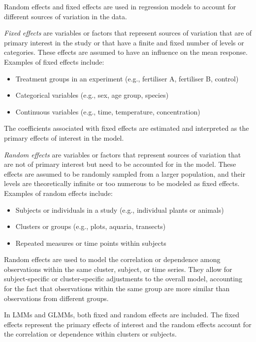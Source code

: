 \documentclass[
  letterpaper,
]{book}
\providecommand{\tightlist}{%
  \setlength{\itemsep}{0pt}\setlength{\parskip}{0pt}}\usepackage{longtable,booktabs,array}
\begin{document}
\begin{tcolorbox}[enhanced jigsaw, opacitybacktitle=0.6, toptitle=1mm, colframe=quarto-callout-note-color-frame, arc=.35mm, left=2mm, rightrule=.15mm, coltitle=black, opacityback=0, bottomrule=.15mm, bottomtitle=1mm, title=\textcolor{quarto-callout-note-color}{\faInfo}\hspace{0.5em}{Fixed and Random Effects}, toprule=.15mm, colbacktitle=quarto-callout-note-color!10!white, titlerule=0mm, leftrule=.75mm, colback=white, breakable]

Random effects and fixed effects are used in regression models to
account for different sources of variation in the data.

\emph{Fixed effects} are variables or factors that represent sources of
variation that are of primary interest in the study or that have a
finite and fixed number of levels or categories. These effects are
assumed to have an influence on the mean response. Examples of fixed
effects include:

\begin{itemize}
\tightlist
\item
  Treatment groups in an experiment (e.g., fertiliser A, fertiliser B,
  control)
\item
  Categorical variables (e.g., sex, age group, species)
\item
  Continuous variables (e.g., time, temperature, concentration)
\end{itemize}

The coefficients associated with fixed effects are estimated and
interpreted as the primary effects of interest in the model.

\emph{Random effects} are variables or factors that represent sources of
variation that are not of primary interest but need to be accounted for
in the model. These effects are assumed to be randomly sampled from a
larger population, and their levels are theoretically infinite or too
numerous to be modeled as fixed effects. Examples of random effects
include:

\begin{itemize}
\tightlist
\item
  Subjects or individuals in a study (e.g., individual plants or
  animals)
\item
  Clusters or groups (e.g., plots, aquaria, transects)
\item
  Repeated measures or time points within subjects
\end{itemize}

Random effects are used to model the correlation or dependence among
observations within the same cluster, subject, or time series. They
allow for subject-specific or cluster-specific adjustments to the
overall model, accounting for the fact that observations within the same
group are more similar than observations from different groups.

In LMMs and GLMMs, both fixed and random effects are included. The fixed
effects represent the primary effects of interest and the random effects
account for the correlation or dependence within clusters or subjects.

\end{tcolorbox}
\end{document}
